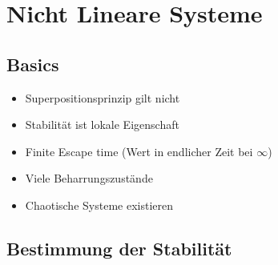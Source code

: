 \section{Nicht Lineare Systeme}
\subsection{Basics}
\begin{itemize}
	\item Superpositionsprinzip gilt nicht
	\item Stabilität ist lokale Eigenschaft
	\item Finite Escape time (Wert in endlicher Zeit bei $\infty$)
	\item Viele Beharrungszustände
	\item Chaotische Systeme existieren
\end{itemize}
\subsection{Bestimmung der Stabilität}
